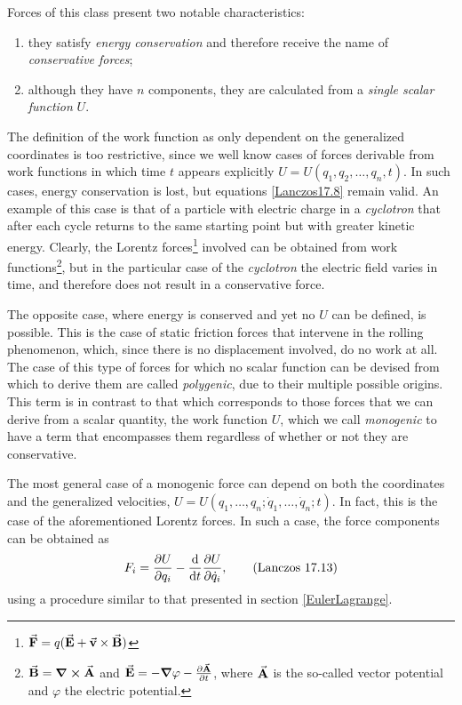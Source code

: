 \documentclass[12pt, english, a4paper]{article}
\begin{document}
Forces of this class present two notable characteristics:
\begin{enumerate}
	\item they satisfy \emph{energy conservation} and therefore receive the name of \emph{conservative forces};
	\item although they have \(n\) components, they are calculated from a \emph{single scalar function} \(U\).
\end{enumerate}

The definition of the work function as only dependent on the generalized coordinates is too restrictive, since we well know cases of forces derivable from work functions in which time \(t\) appears explicitly \(U= U(q_1, q_2, \ldots, q_n,t)\).
In such cases, energy conservation is lost, but equations \eqref{Lanczos17.8} remain valid.
An example of this case is that of a particle with electric charge in a \emph{cyclotron} that after each cycle returns to the same starting point but with greater kinetic energy.
Clearly, the Lorentz forces\footnote{\(\va{F}= q (\va{E}+ \va{v}\times \va{B})\)} involved can be obtained from work functions\footnote{\(\va{B}= \curl{\va{A}}\) and \(\va{E}= -\grad \varphi - \pdv{\va{A}}{t}\), where \(\va{A}\) is the so-called vector potential and \(\varphi\) the electric potential.}, but in the particular case of the \emph{cyclotron} the electric field varies in time, and therefore does not result in a conservative force.

The opposite case, where energy is conserved and yet no \(U\) can be defined, is possible.
This is the case of static friction forces that intervene in the rolling phenomenon, which, since there is no displacement involved, do no work at all.
The case of this type of forces for which no scalar function can be devised from which to derive them are called \emph{polygenic}, due to their multiple possible origins.
This term is in contrast to that which corresponds to those forces that we can derive from a scalar quantity, the work function \(U\), which we call \emph{monogenic} to have a term that encompasses them regardless of whether or not they are conservative.

The most general case of a monogenic force can depend on both the coordinates and the generalized velocities, \(U= U(q_1, \ldots, q_n; \dot{q}_1, \ldots, \dot{q}_n; t)\).
In fact, this is the case of the aforementioned Lorentz forces.
In such a case, the force components can be obtained as
\begin{equation}\label{Lanczos17.13}
	F_i= \pdv{U}{q_i}- \dv{t} \pdv{U}{\dot{q}_i},
	\tag{Lanczos 17.13}
\end{equation}
using a procedure similar to that presented in section \ref{EulerLagrange}.
\end{document}

